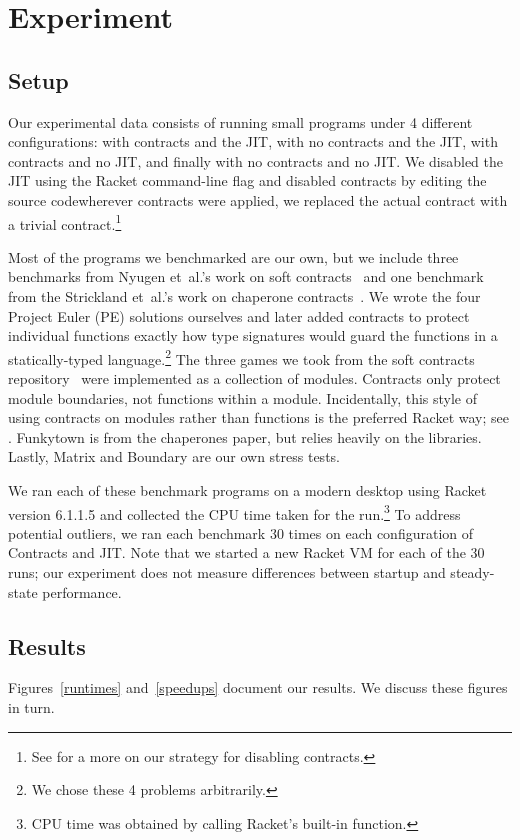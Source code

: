 \section{Experiment}
\label{experiment}
\subsection{Setup}
Our experimental data consists of running small programs under 4 different configurations: with contracts and the JIT, with no contracts and the JIT, with contracts and no JIT, and finally with no contracts and no JIT.
We disabled the JIT using the Racket command-line flag  and disabled contracts by editing the  source code\textemdash wherever contracts were applied, we replaced the actual contract with a trivial  contract.\footnote{See  for a more on our strategy for disabling contracts.}

Most of the programs we benchmarked are our own, but we include three benchmarks from Nyugen et~al.'s work on soft contracts~\cite{soft-contracts} and one benchmark from the Strickland et~al.'s work on chaperone contracts~\cite{chaps}.
We wrote the four Project Euler (PE) solutions ourselves and later added contracts to protect individual functions exactly how type signatures would guard the functions in a statically-typed language.\footnote{We chose these 4 problems arbitrarily.}
The three games we took from the soft contracts repository~\cite{soft-contracts-repo} were implemented as a collection of modules.
Contracts only protect module boundaries, not functions within a module.
Incidentally, this style of using contracts on modules rather than functions is the preferred Racket way; see .
Funkytown is from the chaperones paper, but relies heavily on the  libraries.
Lastly, Matrix and Boundary are our own stress tests.

We ran each of these benchmark programs on a modern desktop using Racket version 6.1.1.5 and collected the CPU time taken for the run.\footnote{CPU time was obtained by calling Racket's built-in  function.}
To address potential outliers, we ran each benchmark 30 times on each configuration of Contracts and JIT.
Note that we started a new Racket VM for each of the 30 runs; our experiment does not measure differences between startup and steady-state performance.

\subsection{Results}
Figures~\ref{runtimes} and~\ref{speedups} document our results.
We discuss these figures in turn.

